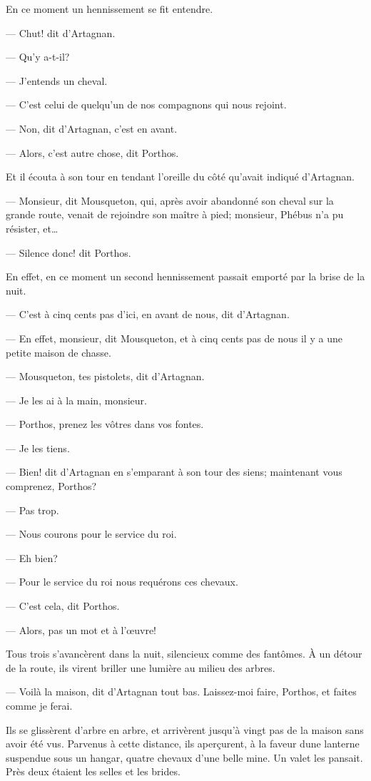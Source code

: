 En ce moment un hennissement se fit entendre.

— Chut! dit d'Artagnan.

— Qu'y a-t-il?

— J'entends un cheval.

— C'est celui de quelqu'un de nos compagnons qui nous rejoint.

— Non, dit d'Artagnan, c'est en avant.

— Alors, c'est autre chose, dit Porthos.

Et il écouta à son tour en tendant l'oreille du côté qu'avait indiqué d'Artagnan.

— Monsieur, dit Mousqueton, qui, après avoir abandonné son cheval sur la grande route, venait de rejoindre son maître à pied; monsieur, Phébus n'a pu résister, et\dots

— Silence donc! dit Porthos.

En effet, en ce moment un second hennissement passait emporté par la brise de la nuit.

— C'est à cinq cents pas d'ici, en avant de nous, dit d'Artagnan.

— En effet, monsieur, dit Mousqueton, et à cinq cents pas de nous il y a une petite maison de chasse.

— Mousqueton, tes pistolets, dit d'Artagnan.

— Je les ai à la main, monsieur.

— Porthos, prenez les vôtres dans vos fontes.

— Je les tiens.

— Bien! dit d'Artagnan en s'emparant à son tour des siens; maintenant vous comprenez, Porthos?

— Pas trop.

— Nous courons pour le service du roi.

— Eh bien?

— Pour le service du roi nous requérons ces chevaux.

— C'est cela, dit Porthos.

— Alors, pas un mot et à l'œuvre!

Tous trois s'avancèrent dans la nuit, silencieux comme des fantômes. À un détour de la route, ils virent briller une lumière au milieu des arbres.

— Voilà la maison, dit d'Artagnan tout bas. Laissez-moi faire, Porthos, et faites comme je ferai.

Ils se glissèrent d'arbre en arbre, et arrivèrent jusqu'à vingt pas de la maison sans avoir été vus. Parvenus à cette distance, ils aperçurent, à la faveur dune lanterne suspendue sous un hangar, quatre chevaux d'une belle mine. Un valet les pansait. Près deux étaient les selles et les brides.

